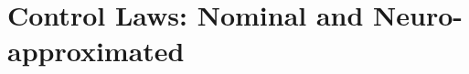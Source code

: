 \documentclass[journal,twoside,web]{ieeecolor}
\begin{document}




\section{Control Laws: Nominal and Neuro-approximated}
\end{document}
